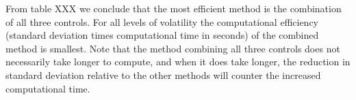 \documentclass[11pt,a4paper,oneside]{article}
\begin{document}
From table XXX we conclude that the most efficient method is the combination of all three controls. For all levels of volatility the computational efficiency (standard deviation times computational time in seconds) of the combined method is smallest. Note that the method combining all three controls does not necessarily take longer to compute, and when it does take longer, the reduction in standard deviation relative to the other methods will counter the increased computational time.     
\end{document}
